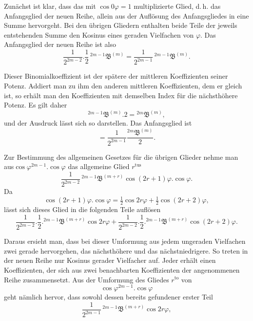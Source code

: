 \par\noindent{}%
\hspace*{\parindent}Zunächst ist klar, dass das mit $\cos 0\varphi = 1$ multiplizierte Glied, d.\,h. das Anfangsglied der neuen Reihe, allein aus der Auflösung des Anfangsgliedes in eine Summe hervorgeht. Bei den übrigen Gliedern enthalten beide Teile der jeweils entstehenden Summe den Kosinus eines geraden Vielfachen von $\varphi$. Das Anfangsglied der neuen Reihe ist also
\[
\frac{1}{2^{2m-2}} . \frac{1}{2}\,{}^{2m-1}\mathfrak{B}^{(m)}
= \frac{1}{2^{2m-1}}\,{}^{2m-1}\mathfrak{B}^{(m)}.
\]

\par\noindent Dieser Binomialkoeffizient ist der spätere der mittleren Koeffizienten seiner Potenz. Addiert man zu ihm den anderen mittleren Koeffizienten, dem er gleich ist, so erhält man den Koeffizienten mit demselben Index für die nächsthöhere Potenz. Es gilt daher
\[
{}^{2m-1}\mathfrak{B}^{(m)} .  2 = {}^{2m}\mathfrak{B}^{(m)},
\]
und der Ausdruck lässt sich so darstellen. Das Anfangsglied ist
\[
= \frac{1}{2^{2m-1}}\frac{{}^{2m}\mathfrak{B}^{(m)}}{2}.
\]

\par\noindent Zur Bestimmung des allgemeinen Gesetzes für die übrigen Glieder nehme man aus\hfill\mbox{}\linebreak $\cos\varphi^{2m-1} . \cos\varphi$
das allgemeine Glied $r^{\text{tus}}$
\[
\frac{1}{2^{2m-2}}\,{}^{2m-1}\mathfrak{B}^{(m+r)}\cos(2r+1)\varphi . \cos\varphi.
\]
Da
\[
\cos(2r+1)\varphi . \cos\varphi = \tfrac{1}{2}\cos 2r\varphi + \tfrac{1}{2}\cos(2r+2)\varphi,
\]
lässt sich dieses Glied in die folgenden Teile auflösen
\[
\frac{1}{2^{2m-2}} . \frac{1}{2} . {}^{2m-1}\mathfrak{B}^{(m+r)}\cos 2r\varphi
+ \frac{1}{2^{2m-2}} . \frac{1}{2} . {}^{2m-1}\mathfrak{B}^{(m+r)}\cos(2r+2)\varphi.
\]

Daraus ersieht man, dass bei dieser Umformung aus jedem ungeraden Vielfachen zwei gerade hervorgehen, das nächsthöhere und das nächstniedrigere. So treten in der neuen Reihe nur Kosinus gerader Vielfacher auf. Jeder erhält einen Koeffizienten, der sich aus zwei benachbarten Koeffizienten der angenommenen Reihe zusammensetzt. Aus der Umformung des Gliedes $r^{\text{to}}$ von
\[
\cos\varphi^{2m-1} . \cos\varphi
\]
geht nämlich hervor, dass sowohl dessen bereits gefundener erster Teil
\[
\frac{1}{2^{2m-1}}\,{}^{2m-1}\mathfrak{B}^{(m+r)}\cos 2r\varphi,
\]
